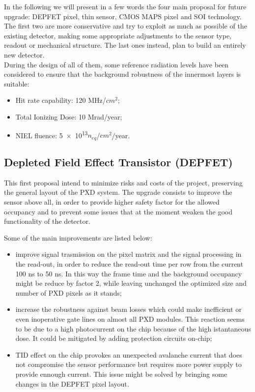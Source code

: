 In the following we will present in a few words the four main proposal for future upgrade: DEPFET pixel, thin sensor, CMOS MAPS pixel and SOI technology.
The first two are more conservative and try to exploit as much as possible of the existing detector, making some appropriate adjustments to the sensor type, readout or mechanical structure. The last ones instead, plan to build an entirely new detector.\\

During the design of all of them, some reference radiation levels have been considered to ensure that the background robustness of the innermost layers is suitable:

\begin{itemize}
\item Hit rate capability: 120 MHz/$cm^{2}$;
\item Total Ionizing Dose: 10 Mrad/year;
\item NIEL fluence: \num{5e13}$n_{eq}$/$cm^{2}$/year.
\end{itemize}


\subsection{Depleted Field Effect Transistor (DEPFET)}

This first proposal intend to minimize risks and costs of the project, preserving the general layout of the PXD system. The upgrade consists to improve the sensor above all, in order to provide higher safety factor for the allowed occupancy and to prevent some issues that at the moment weaken the good functionality of the detector.

Some of the main improvements are listed below:

\begin{itemize}
\item improve signal trasmission on the pixel matrix and the signal processing in the read-out, in order to reduce the read-out time per row from the current 100 ns to 50 ns. In this way the frame time and the background occupancy might be reduce by factor 2, while leaving unchanged the optimized size and number of PXD pixels as it stands;
\item increase the robustness against beam losses which could make inefficient or even inoperative gate lines on almost all PXD modules. This reaction seems to be due to a high photocurrent on the chip because of the high istantaneous dose. It could be mitigated by adding protection circuits on-chip;
\item TID effect on the chip provokes an unexpected avalanche current that does not compromise the sensor performance but requires more power supply to provide ennough current. This issue might be solved by bringing some changes in the DEPFET pixel layout.
\end{itemize}


